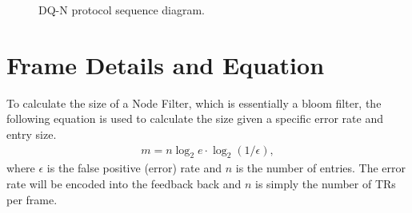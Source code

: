 \documentclass{article}
\begin{document}
\begin{figure}[htb]
     \centering
     \caption{DQ-N protocol sequence diagram.}
     \label{fig:dqn-seq}
\end{figure}

\section{Frame Details and Equation}
\label{app:sec:frame}
To calculate the size of a Node Filter, which is essentially a bloom filter, the following equation is used to calculate the size given a specific error rate and entry size.
\begin{align}
\label{eqn:node_filter}
m = n\log_2e\cdot \log_2(1/\epsilon),
\end{align}
where $\epsilon$ is the false positive (error) rate and $n$ is the number of entries. The error rate will be encoded into the feedback back and $n$ is simply the number of TRs per frame.
\end{document}
